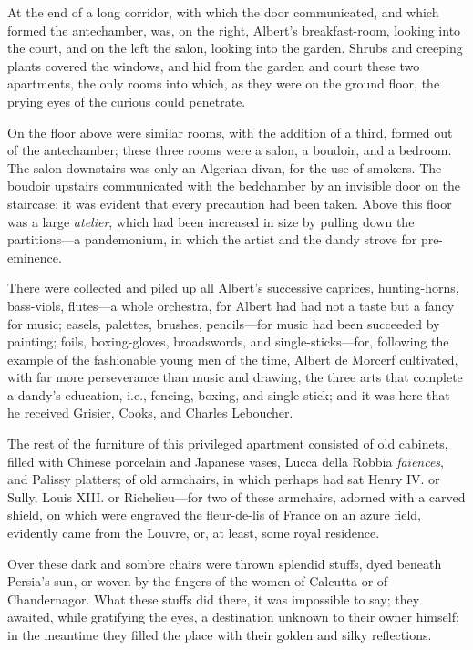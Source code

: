 At the end of a long corridor, with which the door communicated, and
which formed the antechamber, was, on the right, Albert’s
breakfast-room, looking into the court, and on the left the salon,
looking into the garden. Shrubs and creeping plants covered the
windows, and hid from the garden and court these two apartments, the
only rooms into which, as they were on the ground floor, the prying
eyes of the curious could penetrate.

On the floor above were similar rooms, with the addition of a third,
formed out of the antechamber; these three rooms were a salon, a
boudoir, and a bedroom. The salon downstairs was only an Algerian
divan, for the use of smokers. The boudoir upstairs communicated with
the bedchamber by an invisible door on the staircase; it was evident
that every precaution had been taken. Above this floor was a large
\textit{atelier}, which had been increased in size by pulling down the
partitions—a pandemonium, in which the artist and the dandy strove for
pre-eminence.

There were collected and piled up all Albert’s successive caprices,
hunting-horns, bass-viols, flutes—a whole orchestra, for Albert had had
not a taste but a fancy for music; easels, palettes, brushes,
pencils—for music had been succeeded by painting; foils, boxing-gloves,
broadswords, and single-sticks—for, following the example of the
fashionable young men of the time, Albert de Morcerf cultivated, with
far more perseverance than music and drawing, the three arts that
complete a dandy’s education, i.e., fencing, boxing, and single-stick;
and it was here that he received Grisier, Cooks, and Charles Leboucher.

The rest of the furniture of this privileged apartment consisted of old
cabinets, filled with Chinese porcelain and Japanese vases, Lucca della
Robbia \textit{faïences}, and Palissy platters; of old armchairs, in which
perhaps had sat Henry IV. or Sully, Louis XIII. or Richelieu—for two of
these armchairs, adorned with a carved shield, on which were engraved
the fleur-de-lis of France on an azure field, evidently came from the
Louvre, or, at least, some royal residence.

Over these dark and sombre chairs were thrown splendid stuffs, dyed
beneath Persia’s sun, or woven by the fingers of the women of Calcutta
or of Chandernagor. What these stuffs did there, it was impossible to
say; they awaited, while gratifying the eyes, a destination unknown to
their owner himself; in the meantime they filled the place with their
golden and silky reflections.

